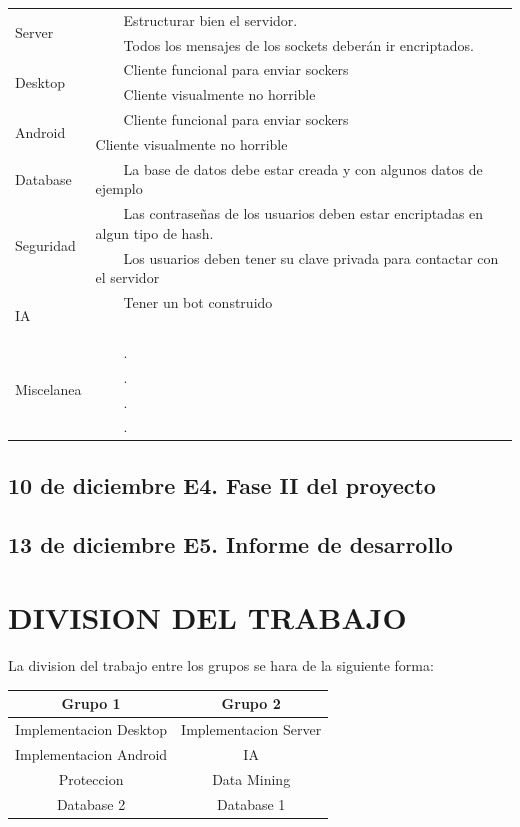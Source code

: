 \documentclass{article}
\newcommand{\tabitem}{~~\llap{\textbullet}~~}
\theoremstyle{definition}
\begin{document}
\begin{tabular}{|p{3cm}|p{11cm}|}
\hline
\multirow{2}{*}{Server} & \tabitem Estructurar bien el servidor.\\
& \tabitem Todos los mensajes de los sockets deberán ir encriptados.\\
\hline
\multirow{2}{*}{Desktop} & \tabitem Cliente funcional para enviar sockers\\
& \tabitem Cliente visualmente no horrible \\
\hline  
 \multirow{2}{*}{Android} & \tabitem Cliente funcional para enviar sockers \\
 & Cliente visualmente no horrible \\
\hline 
 Database & \tabitem  La base de datos debe estar creada y con algunos datos de ejemplo \\
 \hline 
 \multirow{2}{*}{Seguridad} & \tabitem Las contraseñas de los usuarios deben estar encriptadas en algun tipo de hash. \\
 & \tabitem Los usuarios deben tener su clave privada para contactar con el servidor\\
 \hline 
 \multirow{2}{*}{IA} & \tabitem Tener un bot construido \\
 &  \tabitem \\
 \hline 
 \multirow{4}{*}{Miscelanea} & \tabitem  . \\
 & \tabitem . \\
 & \tabitem .\\
 & \tabitem .\\
\hline
\end{tabular}

\subsection{10 de diciembre	E4. Fase II del proyecto}
\subsection{13 de diciembre	E5. Informe de desarrollo}

\section{DIVISION DEL TRABAJO}

La division del trabajo entre los grupos se hara de la siguiente forma:

\begin{center}
\begin{tabular}{|c|c|}
    \hline Grupo 1 & Grupo 2 \\
    \hline Implementacion Desktop & Implementacion Server \\
    Implementacion Android & IA \\
    Proteccion & Data Mining \\
    Database 2 & Database 1 \\
    \hline
\end{tabular}
\end{center}\smallskip
\end{document}
